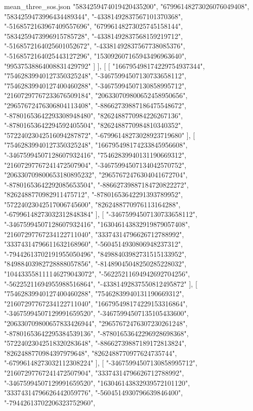 \begin{filecontents*}[overwrite]{mean_three_sos.json}
    "5834259474019420435200",
    "67996148273026076049408",
    "5834259473996434489344",
    "-43381492837567101370368",
    "-5168572163967409557696",
    "67996148273025745158144",
    "5834259473996915785728",
    "-43381492837568159219712",
    "-5168572164025601052672",
    "-43381492837567738085376",
    "-5168572164025443127296",
    "153092607165943496963640",
    "99537538864008831429792"
   ]
  ],
  [
   [
    "166795498174229754937344",
    "75462839940127350325248",
    "-34675994507130733658112",
    "75462839940127400460288",
    "-34675994507130858995712",
    "21607297767233676509184",
    "206330709800652458950656",
    "29657672476306804113408",
    "-88662739887186475548672",
    "-87801653642293308948480",
    "8262488770984226267136",
    "-87801653642294592405504",
    "8262488770984810340352",
    "57224023042516094287872",
    "-67996148273028923719680"
   ],
   [
    "75462839940127350325248",
    "166795498174233845956608",
    "-34675994507128607932416",
    "75462839940131190669312",
    "21607297767241472507904",
    "-34675994507134042570752",
    "206330709800653180895232",
    "29657672476304041672704",
    "-87801653642292085653504",
    "-88662739887184720822272",
    "8262488770982911475712",
    "-87801653642291393789952",
    "57224023042517006745600",
    "8262488770976113164288",
    "-67996148273032312848384"
   ],
   [
    "-34675994507130733658112",
    "-34675994507128607932416",
    "163046143832919879057408",
    "21607297767234122711040",
    "33374314796626712788992",
    "33374314796611632168960",
    "-5604514930806948237312",
    "-79442613702191955050496",
    "84988403982731515133952",
    "84988403982728888057856",
    "-81489045048250285228032",
    "104433558111146279043072",
    "-56225211694942692704256",
    "-56225211694955988516864",
    "-43381492837550812495872"
   ],
   [
    "75462839940127400460288",
    "75462839940131190669312",
    "21607297767234122711040",
    "166795498174229153316864",
    "-34675994507129991659520",
    "-34675994507135105433600",
    "206330709800657833426944",
    "29657672476307230261248",
    "-87801653642295384539136",
    "-87801653642296928698368",
    "57224023042518320283648",
    "-88662739887189172813824",
    "8262488770984397979648",
    "8262488770977624735744",
    "-67996148273032112308224"
   ],
   [
    "-34675994507130858995712",
    "21607297767241472507904",
    "33374314796626712788992",
    "-34675994507129991659520",
    "163046143832939572101120",
    "33374314796626442059776",
    "-5604514930796639846400",
    "-79442613702206323752960",

\end{filecontents*}
